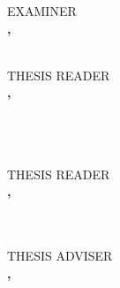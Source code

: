 \documentclass[a4paper, 12pt]{report}
\newif\ifexaminer     \examinertrue
\newif\ifexaminertwo  \examinertwofalse
\begin{document}
                \vspace{0.75 cm} 
            \else
                \vspace{0.75 cm} 
                \begin{minipage}[t]{.44\textwidth}\centering
                    EXAMINER\\
                    \vspace{0.1 cm} 
                    \textbf{\MakeUppercase{\examiner}, \examinerdegree}\\
                    \small{
                    \examinerposition\\
                    \examineruniv}
                \end{minipage}\hspace{.02\textwidth}
                \begin{minipage}[t]{.44\textwidth}\centering
                    THESIS READER\\
                \vspace{0.1 cm} 
                    \textbf{\MakeUppercase{\reader}, \readerdegree}\\
                    \small{
                    \readerposition\\
                    \readeruniv}\\
                    \vspace{0.75 cm} 
                \end{minipage}\\
            \fi
        \else
            \vspace{0.75 cm} 
            THESIS READER\\
            \vspace{0.1 cm} 
            \textbf{\MakeUppercase{\reader}, \readerdegree}\\
            \small{
            \readerposition\\
            \readeruniv}\\
        \fi
    \else
        \ifexaminer
            \ifexaminertwo
                \begin{minipage}[t]{.44\textwidth}\centering
                    THESIS ADVISER\\
                    \vspace{0.1 cm} 
                    \textbf{\MakeUppercase{\adviserone}, \adviseronedegree}\\
                    \small{
                    \adviseroneposition\\
                    \adviseroneuniv}
                \end{minipage}\hspace{.02\textwidth}
\end{document}
